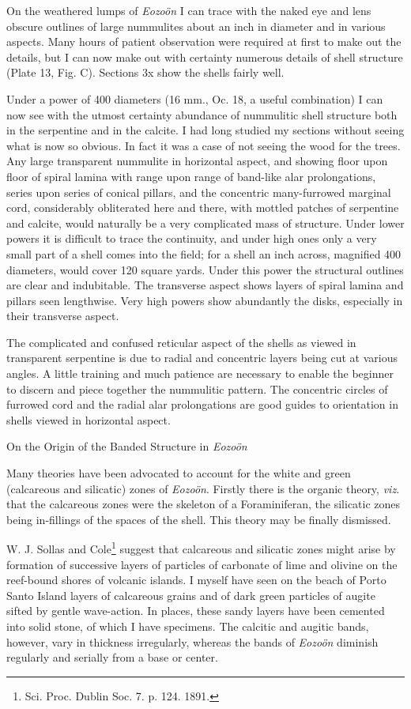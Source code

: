 \documentclass[a4paper, 12pt, oneside]{article}
\begin{document}
On the weathered lumps of \emph{Eozoön} I can trace with the naked eye and lens obscure outlines of large nummulites about an inch in diameter and in various aspects. Many hours of patient observation were required at first to make out the details, but I can now make out with certainty numerous details of shell structure (Plate 13, Fig. C). Sections 3x show the shells fairly well.

Under a power of 400 diameters (16 mm., Oc. 18, a useful combination) I can now see with the utmost certainty abundance of nummulitic shell structure both in the serpentine and in the calcite. I had long studied my sections without seeing what is now so obvious. In fact it was a case of not seeing the wood for the trees. Any large transparent nummulite in horizontal aspect, and showing floor upon floor of spiral lamina with range upon range of band-like alar prolongations, series upon series of conical pillars, and the concentric many-furrowed marginal cord, considerably obliterated here and there, with mottled patches of serpentine and calcite, would naturally be a very complicated mass of structure. Under lower powers it is difficult to trace the continuity, and under high ones only a very small part of a shell comes into the field; for a shell an inch across, magnified 400 diameters, would cover 120 square yards. Under this power the structural outlines are clear and indubitable. The transverse aspect shows layers of spiral lamina and pillars seen lengthwise. Very high powers show abundantly the disks, especially in their transverse aspect.

The complicated and confused reticular aspect of the shells as viewed in transparent serpentine is due to radial and concentric layers being cut at various angles. A little training and much patience are necessary to enable the beginner to discern and piece together the nummulitic pattern. The concentric circles of furrowed cord and the radial alar prolongations are good guides to orientation in shells viewed in horizontal aspect.

On the Origin of the Banded Structure in \emph{Eozoön}

Many theories have been advocated to account for the white and green (calcareous and silicatic) zones of \emph{Eozoön}. Firstly there is the organic theory, \emph{viz.} that the calcareous zones were the skeleton of a Foraminiferan, the silicatic zones being in-fillings of the spaces of the shell. This theory may be finally dismissed.

W. J. Sollas and Cole\footnote{Sci. Proc. Dublin Soc. 7. p. 124. 1891.} suggest that calcareous and silicatic zones might arise by formation of successive layers of particles of carbonate of lime and olivine on the reef-bound shores of volcanic islands. I myself have seen on the beach of Porto Santo Island layers of calcareous grains and of dark green particles of augite sifted by gentle wave-action. In places, these sandy layers have been cemented into solid stone, of which I have specimens. The calcitic and augitic bands, however, vary in thickness irregularly, whereas the bands of \emph{Eozoön} diminish regularly and serially from a base or center.
\end{document}
